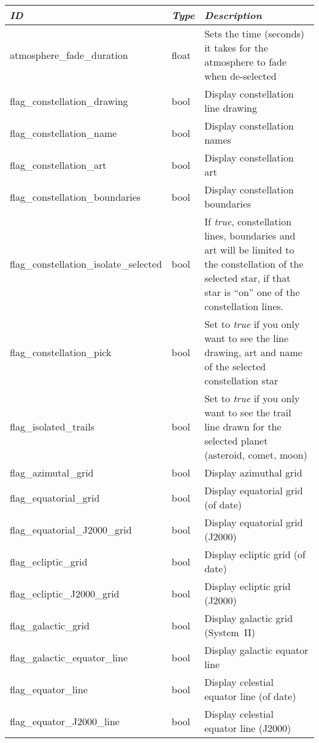 \begin{longtabu} to \textwidth {l|l|X}
\toprule
\emph{ID} & \emph{Type} & \emph{Description}\\\midrule
atmosphere\_fade\_duration      & float & Sets the time (seconds) it takes for the atmosphere to fade when de-selected\\\midrule
flag\_constellation\_drawing    & bool  & Display constellation line drawing\\\midrule
flag\_constellation\_name       & bool  & Display constellation names\\\midrule
flag\_constellation\_art        & bool  & Display constellation art\\\midrule
flag\_constellation\_boundaries & bool  & Display constellation boundaries \\\midrule
flag\_constellation\_isolate\_selected  & bool & If \emph{true}, constellation lines, boundaries and art will be limited to the constellation of the selected star, 
                                                 if that star is ``on'' one of the constellation lines.\\\midrule
flag\_constellation\_pick     & bool & Set to \emph{true} if you only want to see the line drawing, art and name of the selected constellation star\\\midrule
flag\_isolated\_trails        & bool & Set to \emph{true} if you only want to see the trail line drawn for the selected planet (asteroid, comet, moon)\\\midrule
flag\_azimutal\_grid          & bool & Display azimuthal grid \\\midrule
flag\_equatorial\_grid        & bool & Display equatorial grid (of date) \\\midrule
flag\_equatorial\_J2000\_grid & bool & Display equatorial grid (J2000) \\\midrule
flag\_ecliptic\_grid          & bool & Display ecliptic grid (of date) \\\midrule
flag\_ecliptic\_J2000\_grid   & bool & Display ecliptic grid (J2000) \\\midrule
flag\_galactic\_grid          & bool & Display galactic grid (System~II)\\\midrule
flag\_galactic\_equator\_line & bool & Display galactic equator line \\\midrule
flag\_equator\_line           & bool & Display celestial equator line (of date) \\\midrule
flag\_equator\_J2000\_line    & bool & Display celestial equator line (J2000) \\\midrule

\end{longtabu}
